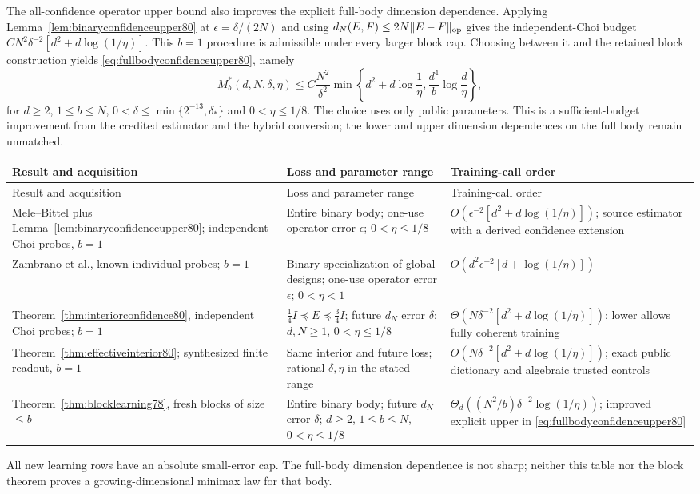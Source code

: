 The all-confidence operator upper bound also improves the explicit
full-body dimension dependence. Applying
Lemma~\ref{lem:binaryconfidenceupper80} at
$\epsilon=\delta/(2N)$ and using
$d_N(E,F)\le2N\|E-F\|_{\rm op}$ gives the independent-Choi
budget $CN^2\delta^{-2}[d^2+d\log(1/\eta)]$.
This $b=1$ procedure is admissible under every larger block cap.
Choosing between it and the retained block construction yields
\eqref{eq:fullbodyconfidenceupper80}, namely
\[
 M_b^*(d,N,\delta,\eta)
 \le C\frac{N^2}{\delta^2}
       \min\!\left\{d^2+d\log\frac1\eta,
                    \frac{d^4}{b}\log\frac d\eta\right\},
\]
for $d\ge2$, $1\le b\le N$,
$0<\delta\le\min\{2^{-13},\delta_*\}$ and
$0<\eta\le1/8$. The choice uses only public parameters.
This is a sufficient-budget improvement from the credited
estimator and the hybrid conversion; the lower and upper dimension
dependences on the full body remain unmatched.

\begingroup
\small
\setlength{\tabcolsep}{4pt}
\renewcommand{\arraystretch}{1.17}
\begin{longtable}{@{}>{\raggedright\arraybackslash}p{}>{\raggedright\arraybackslash}p{}>{\raggedright\arraybackslash}p{}@{}}
\toprule
Result and acquisition & Loss and parameter range & Training-call order\\
\midrule
\endfirsthead
\toprule
Result and acquisition & Loss and parameter range & Training-call order\\
\midrule
\endhead
Mele--Bittel plus Lemma~\ref{lem:binaryconfidenceupper80};
independent Choi probes, $b=1$ &
Entire binary body; one-use operator error $\epsilon$;
$0<\eta\le1/8$ &
$O(\epsilon^{-2}[d^2+d\log(1/\eta)])$;
source estimator with a derived confidence extension\\
Zambrano et al., known individual probes; $b=1$ &
Binary specialization of global designs; one-use operator error
$\epsilon$; $0<\eta<1$ &
$O(d^2\epsilon^{-2}[d+\log(1/\eta)])$\\
Theorem~\ref{thm:interiorconfidence80}, independent Choi probes;
$b=1$ &
$\tfrac14I\preceq E\preceq\tfrac34I$;
future $d_N$ error $\delta$;
$d,N\ge1$, $0<\eta\le1/8$ &
$\Theta(N\delta^{-2}[d^2+d\log(1/\eta)])$;
lower allows fully coherent training\\
Theorem~\ref{thm:effectiveinterior80}; synthesized finite readout,
$b=1$ &
Same interior and future loss; rational $\delta,\eta$ in the
stated range &
$O(N\delta^{-2}[d^2+d\log(1/\eta)])$;
exact public dictionary and algebraic trusted controls\\
Theorem~\ref{thm:blocklearning78}, fresh blocks of size $\le b$ &
Entire binary body; future $d_N$ error $\delta$;
$d\ge2$, $1\le b\le N$,
$0<\eta\le1/8$ &
$\Theta_d((N^2/b)\delta^{-2}\log(1/\eta))$;
improved explicit upper in
\eqref{eq:fullbodyconfidenceupper80}\\
\bottomrule
\end{longtable}
\endgroup
All new learning rows have an absolute small-error cap.
The full-body dimension dependence is not sharp; neither this table
nor the block theorem proves a growing-dimensional minimax law
for that body.

